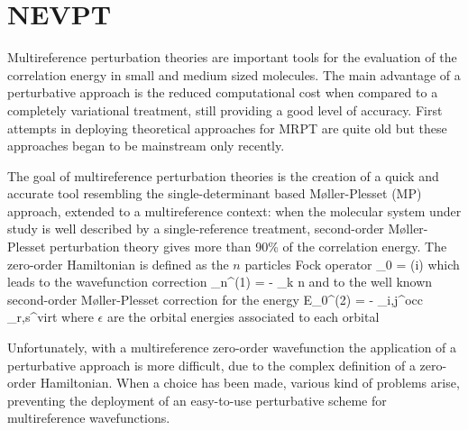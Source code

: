 \pagestyle{fancy}
\chapter{NEVPT}
\label{chp:nevpt}

Multireference perturbation theories are important tools for the
evaluation of the correlation energy in small and medium sized molecules.
The main advantage of a perturbative approach is the reduced computational
cost when compared to a completely variational treatment, still providing a
good level of accuracy.  First attempts in deploying theoretical approaches
for MRPT are quite old\cite{rmp-39-771-1967,jcp-58-5745-1973} but these
approaches began to be mainstream only recently.

The goal of multireference perturbation theories is the creation of a quick
and accurate tool resembling the single-determinant based M{\o}ller-Plesset
(MP) approach\cite{pr-46-618-1934}, extended to a multireference context:
when the molecular system under study is well described by a
single-reference treatment, second-order M{\o}ller-Plesset perturbation
theory gives more than 90\% of the correlation energy. The zero-order
Hamiltonian is defined as the $n$ particles Fock operator 
\beq
\ham_0 =  \fock(i)
\eeq
which leads to the wavefunction correction
\beq
\Psi_n^{(1)} = - \sum_{k \neq n} 
\eeq
and to the well known second-order M{\o}ller-Plesset correction for the energy
\beq
E_0^{(2)} = - \sum_{i,j}^{\mbox{\tiny occ}} \sum_{r,s}^{\mbox{\tiny virt}} 
\eeq
where $\epsilon$ are the orbital energies associated to each orbital

Unfortunately, with a multireference zero-order wavefunction the application
of a perturbative approach is more difficult, due to the complex definition
of a zero-order Hamiltonian.  When a choice has been made, various kind of
problems arise, preventing the deployment of an easy-to-use perturbative
scheme for multireference wavefunctions. 

